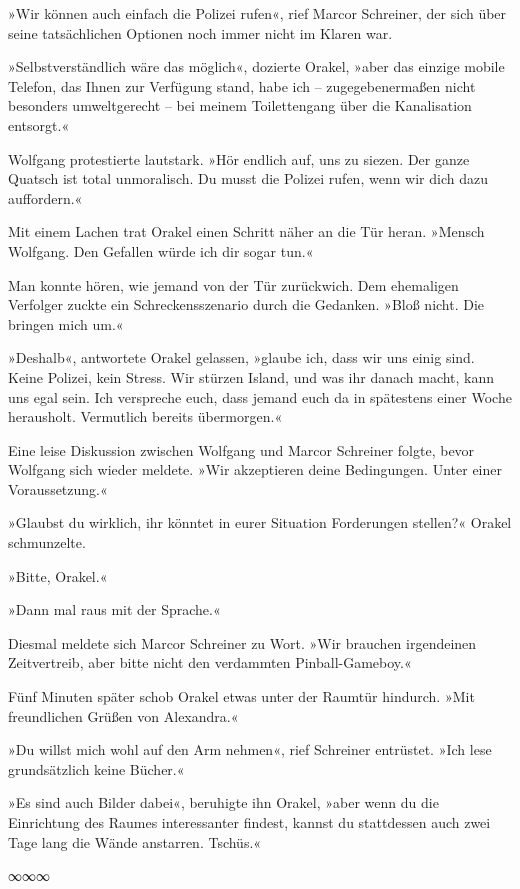 »Wir können auch einfach die Polizei rufen«, rief Marcor Schreiner, der sich über seine tatsächlichen Optionen noch immer nicht im Klaren war.

»Selbstverständlich wäre das möglich«, dozierte Orakel, »aber das einzige mobile Telefon, das Ihnen zur Verfügung stand, habe ich – zugegebenermaßen nicht besonders umweltgerecht – bei meinem Toilettengang über die Kanalisation entsorgt.«

Wolfgang protestierte lautstark. »Hör endlich auf, uns zu siezen. Der ganze Quatsch ist total unmoralisch. Du musst die Polizei rufen, wenn wir dich dazu auffordern.«

Mit einem Lachen trat Orakel einen Schritt näher an die Tür heran. »Mensch Wolfgang. Den Gefallen würde ich dir sogar tun.«

Man konnte hören, wie jemand von der Tür zurückwich. Dem ehemaligen Verfolger zuckte ein Schreckensszenario durch die Gedanken. »Bloß nicht. Die bringen mich um.«

»Deshalb«, antwortete Orakel gelassen, »glaube ich, dass wir uns einig sind. Keine Polizei, kein Stress. Wir stürzen Island, und was ihr danach macht, kann uns egal sein. Ich verspreche euch, dass jemand euch da in spätestens einer Woche herausholt. Vermutlich bereits übermorgen.«

Eine leise Diskussion zwischen Wolfgang und Marcor Schreiner folgte, bevor Wolfgang sich wieder meldete. »Wir akzeptieren deine Bedingungen. Unter einer Voraussetzung.«

»Glaubst du wirklich, ihr könntet in eurer Situation Forderungen stellen?« Orakel schmunzelte.

»Bitte, Orakel.«

»Dann mal raus mit der Sprache.«

Diesmal meldete sich Marcor Schreiner zu Wort. »Wir brauchen irgendeinen Zeitvertreib, aber bitte nicht den verdammten Pinball-Gameboy.«

Fünf Minuten später schob Orakel etwas unter der Raumtür hindurch. »Mit freundlichen Grüßen von Alexandra.«

»Du willst mich wohl auf den Arm nehmen«, rief Schreiner entrüstet. »Ich lese grundsätzlich keine Bücher.«

»Es sind auch Bilder dabei«, beruhigte ihn Orakel, »aber wenn du die Einrichtung des Raumes interessanter findest, kannst du stattdessen auch zwei Tage lang die Wände anstarren. Tschüs.«

\begin{center}
	∞∞∞
\end{center}

